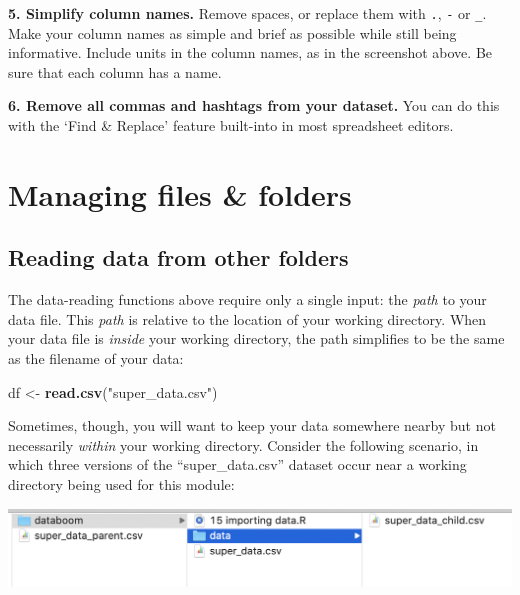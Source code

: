 \documentclass[]{book}
\newenvironment{Shaded}{\begin{snugshade}}{\end{snugshade}}
\newcommand{\KeywordTok}[1]{\textcolor[rgb]{0.13,0.29,0.53}{\textbf{#1}}}
\newcommand{\NormalTok}[1]{#1}
\newcommand{\StringTok}[1]{\textcolor[rgb]{0.31,0.60,0.02}{#1}}
\begin{document}
\textbf{5. Simplify column names.} Remove spaces, or replace them with \texttt{.}, \texttt{-} or \texttt{\_}. Make your column names as simple and brief as possible while still being informative. Include units in the column names, as in the screenshot above. Be sure that each column has a name.

\textbf{6. Remove all commas and hashtags from your dataset.} You can do this with the `Find \& Replace' feature built-into in most spreadsheet editors.

\hypertarget{managing-files-folders}{%
\section*{Managing files \& folders}\label{managing-files-folders}}

\hypertarget{reading-data-from-other-folders}{%
\subsection*{Reading data from other folders}\label{reading-data-from-other-folders}}

The data-reading functions above require only a single input: the \emph{path} to your data file. This \emph{path} is relative to the location of your working directory. When your data file is \emph{inside} your working directory, the path simplifies to be the same as the filename of your data:

\begin{Shaded}
\begin{Highlighting}[]
\NormalTok{df <-}\StringTok{ }\KeywordTok{read.csv}\NormalTok{(}\StringTok{"super_data.csv"}\NormalTok{)}
\end{Highlighting}
\end{Shaded}

Sometimes, though, you will want to keep your data somewhere nearby but not necessarily \emph{within} your working directory. Consider the following scenario, in which three versions of the ``super\_data.csv'' dataset occur near a working directory being used for this module:

\includegraphics{img/csv_wd.png}
\end{document}
